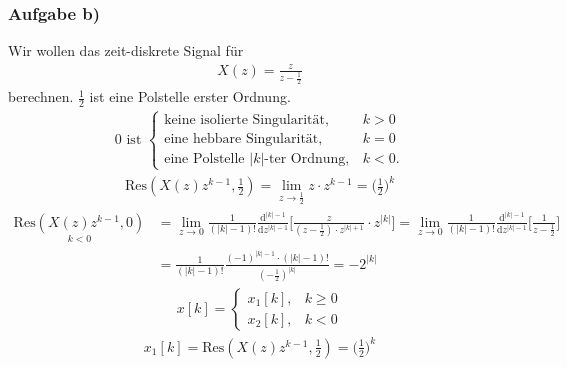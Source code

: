 \subsubsection{Aufgabe b)}
Wir wollen das zeit-diskrete Signal für
\begin{align}
	X(z)=\frac{z}{z-\frac{1}{2}}
\end{align}
berechnen.
$\frac{1}{2}$ ist eine Polstelle erster Ordnung. \\
\begin{align}
	0\text{ ist }
	\begin{cases}
		\text{keine isolierte Singularität}, &k > 0 \\
		\text{eine hebbare Singularität}, &k=0 \\
		\text{eine Polstelle }|k|\text{-ter Ordnung}, &k < 0.
	\end{cases}
\end{align}
\begin{align}
	\mathrm{Res}(X(z)z^{k-1},\frac{1}{2})=\lim\limits_{z\rightarrow\frac{1}{2}}z\cdot z^{k-1}=\bigg (\frac{1}{2} \bigg)^k
\end{align}
\begin{align}
	\underset{k<0}{\mathrm{Res}(X(z)z^{k-1},0)}&=\lim\limits_{z\rightarrow0}\frac{1}{(|k|-1)!}\frac{\mathrm{d}^{|k|-1}}{\mathrm{d}z^{|k|-1}}\Bigg [\frac{z}{(z-\frac{1}{2})\cdot z^{|k|+1}}\cdot z^{|k|}\Bigg]=\lim\limits_{z\rightarrow0}\frac{1}{(|k|-1)!}\frac{\mathrm{d}^{|k|-1}}{\mathrm{d}z^{|k|-1}}\Bigg [\frac{1}{z-\frac{1}{2}}\Bigg]\nonumber\\
	&=\frac{1}{(|k|-1)!}\frac{(-1)^{|k|-1}\cdot (|k|-1)!}{(-\frac{1}{2})^{|k|}}=-2^{|k|}
\end{align}
\begin{align}
	x[k]=\begin{cases}
		x_1[k], &k\geq 0 \\
		x_2[k], &k<0
	\end{cases}
\end{align}
\begin{align}
	x_1[k]=\mathrm{Res}(X(z)z^{k-1},\frac{1}{2})=\bigg( \frac{1}{2} \bigg )^k
\end{align}
